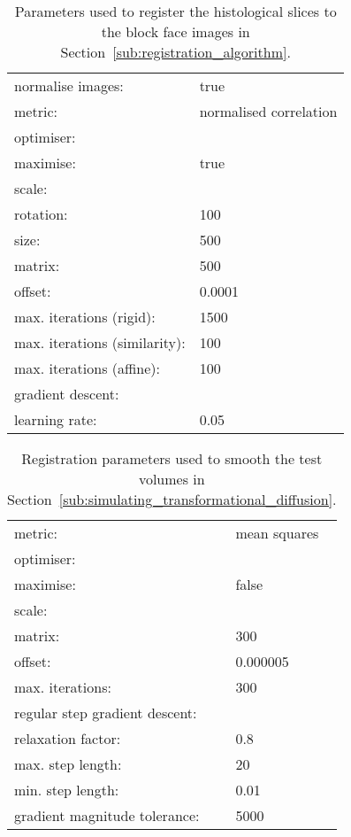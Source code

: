   \begin{table}[h]
    \centering
    \begin{tabular}{|ll|}
      \hline
      normalise images: & true \\
      metric: & normalised correlation \\
      \multicolumn{2}{|l|}{optimiser:} \\
      \quad maximise: & true \\
      \multicolumn{2}{|l|}{\quad scale:} \\
      \quad\quad rotation: & 100 \\
      \quad\quad size: & 500 \\
      \quad\quad matrix: & 500 \\
      \quad\quad offset: & 0.0001 \\
      \quad max. iterations (rigid): & 1500 \\
      \quad max. iterations (similarity): & 100 \\
      \quad max. iterations (affine): & 100 \\
      \multicolumn{2}{|l|}{\quad gradient descent:} \\
      \quad\quad learning rate: & 0.05 \\
      \hline
    \end{tabular}
    
    \caption{Parameters used to register the histological slices to the block face images in Section~\ref{sub:registration_algorithm}.}

  \end{table}
  
  \begin{table}[h]
    \centering
    \begin{tabular}{|ll|}
      \hline
      metric: & mean squares \\
      \multicolumn{2}{|l|}{optimiser:} \\
      \quad maximise: & false\\
      \multicolumn{2}{|l|}{\quad scale:} \\
      \quad\quad matrix: & 300 \\
      \quad\quad offset: & 0.000005 \\
      \quad max. iterations: & 300 \\
      \multicolumn{2}{|l|}{\quad regular step gradient descent:} \\
      \quad\quad relaxation factor: & 0.8 \\
      \quad\quad max. step length: & 20 \\
      \quad\quad min. step length: & 0.01 \\
      \quad\quad gradient magnitude tolerance: & 5000 \\
      \hline
    \end{tabular}
    
    \caption{Registration parameters used to smooth the test volumes in Section~\ref{sub:simulating_transformational_diffusion}.}

  \end{table}
